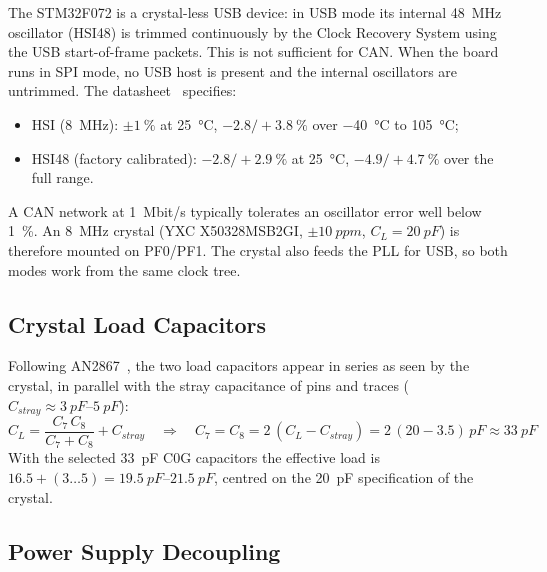 \documentclass[11pt,a4paper]{article}
\begin{document}
The STM32F072 is a crystal-less USB device: in USB mode its internal \qty{48}{MHz} oscillator (HSI48)
is trimmed continuously by the Clock Recovery System using the USB start-of-frame packets.
This is not sufficient for CAN. When the board runs in SPI mode, no USB host is present and
the internal oscillators are untrimmed. The datasheet~\cite{stm32} specifies:
\begin{itemize}
    \item HSI (\qty{8}{MHz}): $\pm\qty{1}{\percent}$ at \qty{25}{\degreeCelsius}, $-2.8/+\qty{3.8}{\percent}$ over \qty{-40}{\degreeCelsius} to \qty{105}{\degreeCelsius};
    \item HSI48 (factory calibrated): $-2.8/+\qty{2.9}{\percent}$ at \qty{25}{\degreeCelsius}, $-4.9/+\qty{4.7}{\percent}$ over the full range.
\end{itemize}
A CAN network at \qty{1}{Mbit/s} typically tolerates an oscillator error well below \qty{1}{\percent}. An \qty{8}{MHz}
crystal (YXC X50328MSB2GI, $\pm\qty{10}{ppm}$, $C_L = \qty{20}{pF}$) is therefore mounted on PF0/PF1. The
crystal also feeds the PLL for USB, so both modes work from the same clock tree.

\subsection{Crystal Load Capacitors}

Following AN2867~\cite{an2867}, the two load capacitors appear in series as seen by the crystal, in parallel
with the stray capacitance of pins and traces ($C_{stray} \approx \qtyrange{3}{5}{pF}$):
\begin{equation}
C_L = \frac{C_7\,C_8}{C_7 + C_8} + C_{stray} \quad\Rightarrow\quad
C_7 = C_8 = 2\,(C_L - C_{stray}) = 2\,(20 - 3.5)\,\unit{pF} \approx \qty{33}{pF}
\end{equation}
With the selected \qty{33}{pF} C0G capacitors the effective load is $16.5 + (3\dots5) = \qtyrange{19.5}{21.5}{pF}$,
centred on the \qty{20}{pF} specification of the crystal.

\subsection{Power Supply Decoupling}
\end{document}
